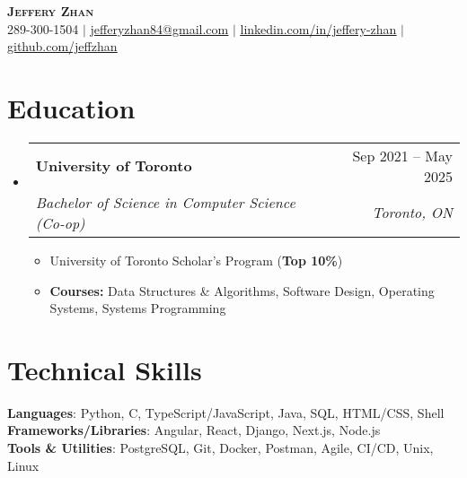 \documentclass[letterpaper,11pt]{article}
\makeatletter
\newcommand{\resumeItem}[1]{
  \item\small{
    {#1 \vspace{-2pt}}
  }
}
\newcommand{\resumeSubheading}[4]{
  \vspace{-2pt}\item
    \begin{tabular*}{0.97\textwidth}[t]{l@{\extracolsep{\fill}}r}
      \textbf{#1} & #2 \\
      \textit{\small#3} & \textit{\small #4} \\
    \end{tabular*}\vspace{-7pt}
}
\newcommand{\resumeSubHeadingListStart}{\begin{itemize}[leftmargin=0.15in, label={}]}
\newcommand{\resumeSubHeadingListEnd}{\end{itemize}}
\newcommand{\resumeItemListStart}{\begin{itemize}}
\newcommand{\resumeItemListEnd}{\end{itemize}\vspace{-5pt}}
\makeatother
\begin{document}

\begin{center}
	\textbf{\Huge \scshape Jeffery Zhan} \\ \vspace{1pt}
	\small 289-300-1504 $|$ \href{mailto:jefferyzhan84@gmail.com}{\underline{jefferyzhan84@gmail.com}} $|$ 
	\href{https://linkedin.com/in/jeffery-zhan}{\underline{linkedin.com/in/jeffery-zhan}} $|$
	\href{https://github.com/jeffzhan}{\underline{github.com/jeffzhan}}
\end{center}

\section{Education}
	\resumeSubHeadingListStart
		\resumeSubheading
		{University of Toronto}{Sep 2021 -- May 2025}
		{Bachelor of Science in Computer Science (Co-op)}{Toronto, ON}
		\resumeItemListStart
			\resumeItem{University of Toronto Scholar's Program (\textbf{Top 10\%})}
			\resumeItem{\textbf{Courses:} Data Structures \& Algorithms, Software Design,  Operating Systems, Systems Programming}
		\resumeItemListEnd
	\resumeSubHeadingListEnd

\section{Technical Skills}
\begin{itemize}[leftmargin=0.15in, label={}]
	\small{\item{
		\textbf{Languages}{: Python, C, TypeScript/JavaScript, Java, SQL, HTML/CSS,  Shell} \\
		\textbf{Frameworks/Libraries}{: Angular, React, Django, Next.js, Node.js} \\
		\textbf{Tools \& Utilities}{: PostgreSQL, Git, Docker, Postman, Agile, CI/CD,  Unix, Linux} \\
	}}
\end{itemize}
\end{document}

